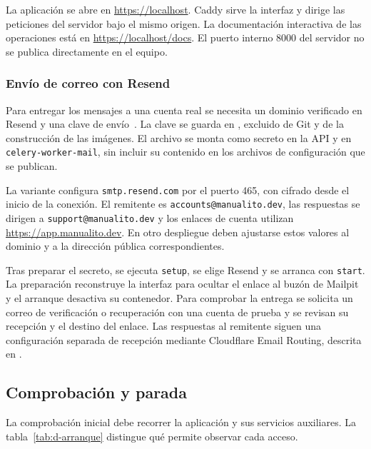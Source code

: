 La aplicación se abre en \url{https://localhost}. Caddy sirve la interfaz y dirige las peticiones del servidor bajo el mismo origen. La documentación interactiva de las operaciones está en \url{https://localhost/docs}. El puerto interno 8000 del servidor no se publica directamente en el equipo.

\subsubsection{Envío de correo con Resend}

Para entregar los mensajes a una cuenta real se necesita un dominio
verificado en Resend y una clave de envío~\cite{resend_smtp}. La clave se
guarda en , excluido de Git y de la
construcción de las imágenes. El archivo se monta como secreto en la
\ac{API} y en \texttt{celery-worker-mail}, sin incluir su contenido en los
archivos de configuración que se publican.

La variante  configura
\texttt{smtp.resend.com} por el puerto 465, con cifrado desde el inicio de
la conexión. El remitente es \texttt{accounts@manualito.dev}, las respuestas
se dirigen a \texttt{support@manualito.dev} y los enlaces de cuenta utilizan
\url{https://app.manualito.dev}. En otro despliegue deben ajustarse estos
valores al dominio y a la dirección pública correspondientes.

Tras preparar el secreto, se ejecuta \texttt{setup}, se elige Resend y se
arranca con \texttt{start}. La preparación reconstruye la interfaz para
ocultar el enlace al buzón de Mailpit y el arranque desactiva su contenedor.
Para comprobar la entrega se solicita un correo de verificación o
recuperación con una cuenta de prueba y se revisan su recepción y el destino
del enlace. Las respuestas al remitente siguen una configuración separada
de recepción mediante Cloudflare Email Routing, descrita en
.

\subsection{Comprobación y parada}

La comprobación inicial debe recorrer la aplicación y sus servicios auxiliares. La tabla~\ref{tab:d-arranque} distingue qué permite observar cada acceso.

